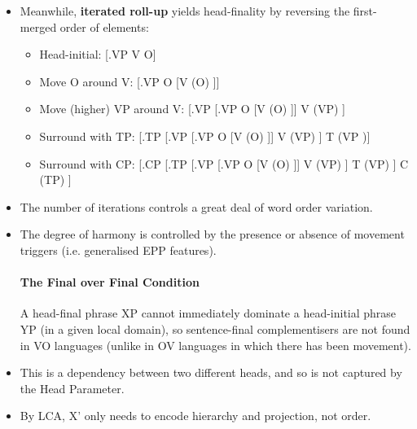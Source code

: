 \documentclass{article}
\begin{document}
\begin{itemize}
\begin{itemize}
    \end{itemize}
    \item Meanwhile, \textbf{iterated roll-up} yields head-finality by reversing the first-merged order of elements:
    \begin{itemize}
        \item Head-initial: [.VP V O]
        \item Move O around V: [.VP O [V (O) ]]
        \item Move (higher) VP around V: [.VP [.VP O [V (O) ]] V (VP) ] 
        \item Surround with TP: [.TP [.VP [.VP O [V (O) ]] V (VP) ] T (VP )]
        \item Surround with CP: [.CP [.TP [.VP [.VP O [V (O) ]] V (VP) ] T (VP) ] C (TP) ]
    \end{itemize}
    \item The number of iterations controls a great deal of word order variation.
    \item The degree of harmony is controlled by the presence or absence of movement triggers (i.e. generalised EPP features).
    \paragraph{The Final over Final Condition} A head-final phrase XP cannot immediately dominate a head-initial phrase YP (in a given local domain), so sentence-final complementisers are not found in VO languages (unlike in OV languages in which there has been movement).
    \item This is a dependency between two different heads, and so is not captured by the Head Parameter.
    \item By LCA, X' only needs to encode hierarchy and projection, not order.
\end{itemize}
\end{document}

